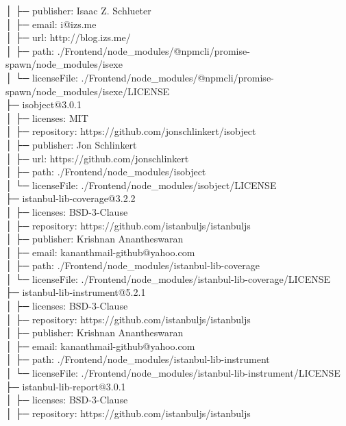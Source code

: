 \documentclass[
    paper=a4,
    twoside=false,
    parskip=half,
    listof=entryprefix,
    listof=totoc,
    index=totoc,
    bibliography=totoc,
    headsepline,
]{scrbook}
\begin{document}
    │  ├─ publisher: Isaac Z. Schlueter\\
    │  ├─ email: i@izs.me\\
    │  ├─ url: http://blog.izs.me/\\
    │  ├─ path: ./Frontend/node\_modules/@npmcli/promise-spawn/node\_modules/isexe\\
    │  └─ licenseFile: ./Frontend/node\_modules/@npmcli/promise-spawn/node\_modules/isexe/LICENSE\\
    ├─ isobject@3.0.1\\
    │  ├─ licenses: MIT\\
    │  ├─ repository: https://github.com/jonschlinkert/isobject\\
    │  ├─ publisher: Jon Schlinkert\\
    │  ├─ url: https://github.com/jonschlinkert\\
    │  ├─ path: ./Frontend/node\_modules/isobject\\
    │  └─ licenseFile: ./Frontend/node\_modules/isobject/LICENSE\\
    ├─ istanbul-lib-coverage@3.2.2\\
    │  ├─ licenses: BSD-3-Clause\\
    │  ├─ repository: https://github.com/istanbuljs/istanbuljs\\
    │  ├─ publisher: Krishnan Anantheswaran\\
    │  ├─ email: kananthmail-github@yahoo.com\\
    │  ├─ path: ./Frontend/node\_modules/istanbul-lib-coverage\\
    │  └─ licenseFile: ./Frontend/node\_modules/istanbul-lib-coverage/LICENSE\\
    ├─ istanbul-lib-instrument@5.2.1\\
    │  ├─ licenses: BSD-3-Clause\\
    │  ├─ repository: https://github.com/istanbuljs/istanbuljs\\
    │  ├─ publisher: Krishnan Anantheswaran\\
    │  ├─ email: kananthmail-github@yahoo.com\\
    │  ├─ path: ./Frontend/node\_modules/istanbul-lib-instrument\\
    │  └─ licenseFile: ./Frontend/node\_modules/istanbul-lib-instrument/LICENSE\\
    ├─ istanbul-lib-report@3.0.1\\
    │  ├─ licenses: BSD-3-Clause\\
    │  ├─ repository: https://github.com/istanbuljs/istanbuljs\\
\end{document}
